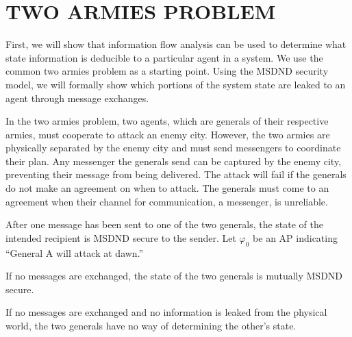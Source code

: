 \section{TWO ARMIES PROBLEM}

First, we will show that information flow analysis can be used to determine what state information is deducible to a particular agent in a system.
We use the common two armies problem as a starting point.
Using the MSDND security model, we will formally show which portions of the system state are leaked to an agent through message exchanges.

In the two armies problem, two agents, which are generals of their respective armies, must cooperate to attack an enemy city.
However, the two armies are physically separated by the enemy city and must send messengers to coordinate their plan.
Any messenger the generals send can be captured by the enemy city, preventing their message from being delivered.
The attack will fail if the generals do not make an agreement on when to attack.
The generals must come to an agreement when their channel for communication, a messenger, is unreliable.

After one message has been sent to one of the two generals, the state of the intended recipient is MSDND secure to the sender.
Let $\varphi_0$ be an \ac{AP} indicating ``General A will attack at dawn.''

\begin{thm}
If no messages are exchanged, the state of the two generals is mutually MSDND secure. \label{thm:nomsg}
\end{thm}
\begin{prooftight}
If no messages are exchanged and no information is leaked from the physical world, the two generals have no way of determining the other's state.
\end{prooftight}

